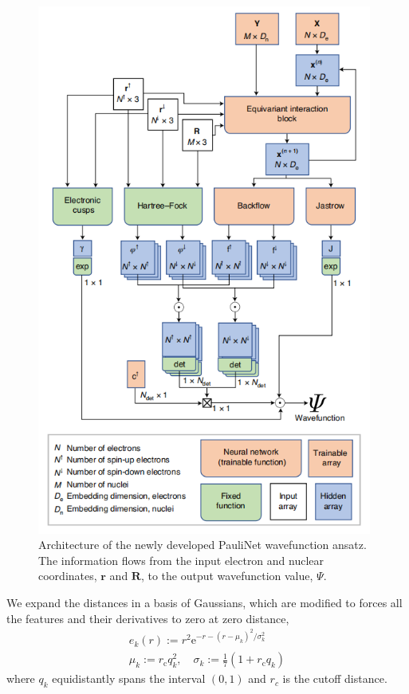 \documentclass[12pt]{article}
\begin{document}
\begin{figure}[H]
    \centering
    \includegraphics[width=11cm]{p2.png}
    \renewcommand{\figurename}{Fig.}
    \caption{Architecture of the newly developed PauliNet wavefunction ansatz. 
    The information flows from the input electron and nuclear coordinates, 
    $\mathbf{r}$ and $\mathbf{R}$, to the output wavefunction value, $\Psi$.}
    \label{img2}
\end{figure}

We expand the distances in a basis of Gaussians, which are modified to forces all 
the features and their derivatives to zero at zero distance,
\begin{equation}
    \begin{array}{l}
        e_{k}(r):=r^{2} \mathrm{e}^{-r-\left(r-\mu_{k}\right)^{2}/\sigma_{k}^{2}}\\
        \mu_{k}:=r_{\mathrm{c}} q_{k}^{2},\quad\sigma_{k}:=\frac{1}{7}
        \left(1+r_{\mathrm{c}} q_{k}\right)
        \end{array}
\end{equation}
where $q_k$ equidistantly spans the interval $(0, 1)$ and $r_c$ is the cutoff 
distance.
\end{document}

